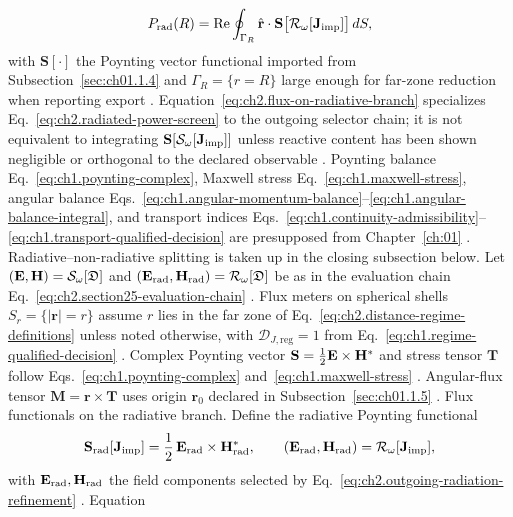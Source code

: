 \begin{equation}
\label{eq:ch2.flux-on-radiative-branch}
P_{\mathrm{rad}}(R)
=
\Re\oint_{\Gamma_R}\hat{\mathbf{r}}\cdot\mathbf{S}\big[\mathcal{R}_\omega[\mathbf{J}_{\mathrm{imp}}]\big]\,dS,
\end{equation}
with \(\mathbf{S}[\cdot]\) the Poynting vector functional imported from
Subsection~\ref{sec:ch01.1.4} and \(\Gamma_R=\{r=R\}\) large enough for far-zone reduction
when reporting export \cite{stratton1941}. Equation~\eqref{eq:ch2.flux-on-radiative-branch}
specializes Eq.~\eqref{eq:ch2.radiated-power-screen} to the outgoing selector chain; it is
not equivalent to integrating \(\mathbf{S}[\mathcal{S}_\omega[\mathbf{J}_{\mathrm{imp}}]]\) unless reactive
content has been shown negligible or orthogonal to the declared observable
\cite{harrington2001}. Poynting balance Eq.~\eqref{eq:ch1.poynting-complex}, Maxwell stress
Eq.~\eqref{eq:ch1.maxwell-stress}, angular balance
Eqs.~\eqref{eq:ch1.angular-momentum-balance}--\eqref{eq:ch1.angular-balance-integral}, and
transport indices Eqs.~\eqref{eq:ch1.continuity-admissibility}--\eqref{eq:ch1.transport-qualified-decision}
are presupposed from Chapter~\ref{ch:01} \cite{stratton1941}. Radiative--non-radiative
splitting is taken up in the closing subsection below.
Let \((\mathbf{E},\mathbf{H})=\mathcal{S}_\omega[\mathfrak{D}]\) and
\((\mathbf{E}_{\mathrm{rad}},\mathbf{H}_{\mathrm{rad}})=\mathcal{R}_\omega[\mathfrak{D}]\) be as in the
evaluation chain Eq.~\eqref{eq:ch2.section25-evaluation-chain} \cite{stratton1941}. Flux meters on
spherical shells \(S_r=\{|\mathbf{r}|=r\}\) assume \(r\) lies in the far zone of
Eq.~\eqref{eq:ch2.distance-regime-definitions} unless noted otherwise, with
\(\mathcal{D}_{J,\mathrm{reg}}=1\) from Eq.~\eqref{eq:ch1.regime-qualified-decision}
\cite{stratton1941}. Complex Poynting vector
\(\mathbf{S}=\tfrac12\mathbf{E}\times\mathbf{H}^*\) and stress tensor \(\mathbf{T}\) follow
Eqs.~\eqref{eq:ch1.poynting-complex} and~\eqref{eq:ch1.maxwell-stress} \cite{stratton1941}.
Angular-flux tensor \(\mathbf{M}=\mathbf{r}\times\mathbf{T}\) uses origin \(\mathbf{r}_0\)
declared in Subsection~\ref{sec:ch01.1.5} \cite{belinfante1940}.
Flux functionals on the radiative branch. Define the radiative Poynting functional
\begin{equation}
\label{eq:ch2.poynting-functional-radiative}
\mathbf{S}_{\mathrm{rad}}[\mathbf{J}_{\mathrm{imp}}]
=
\frac{1}{2}\,\mathbf{E}_{\mathrm{rad}}\times\mathbf{H}_{\mathrm{rad}}^{*},
\qquad
(\mathbf{E}_{\mathrm{rad}},\mathbf{H}_{\mathrm{rad}})=\mathcal{R}_\omega[\mathbf{J}_{\mathrm{imp}}],
\end{equation}
with \(\mathbf{E}_{\mathrm{rad}},\mathbf{H}_{\mathrm{rad}}\) the field components selected by
Eq.~\eqref{eq:ch2.outgoing-radiation-refinement} \cite{stratton1941}. Equation
